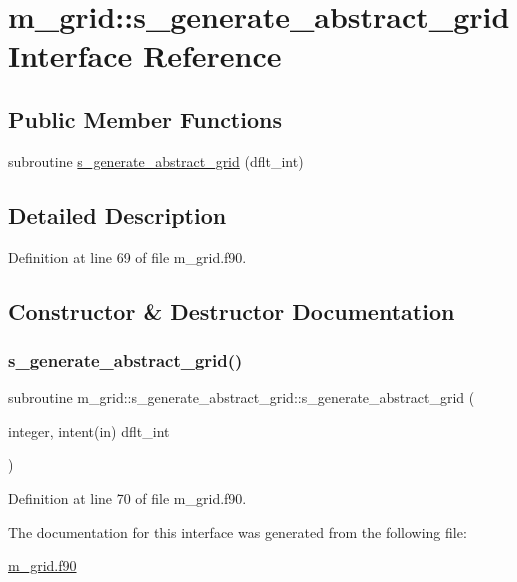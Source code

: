 \hypertarget{interfacem__grid_1_1s__generate__abstract__grid}{}\section{m\+\_\+grid\+:\+:s\+\_\+generate\+\_\+abstract\+\_\+grid Interface Reference}
\label{interfacem__grid_1_1s__generate__abstract__grid}
\subsection*{Public Member Functions}
\begin{DoxyCompactItemize}
\item 
subroutine \hyperlink{interfacem__grid_1_1s__generate__abstract__grid_a44c520d32129f63db3350daf069cba5e}{s\+\_\+generate\+\_\+abstract\+\_\+grid} (dflt\+\_\+int)
\end{DoxyCompactItemize}


\subsection{Detailed Description}


Definition at line 69 of file m\+\_\+grid.\+f90.



\subsection{Constructor \& Destructor Documentation}
\mbox{\label{interfacem__grid_1_1s__generate__abstract__grid_a44c520d32129f63db3350daf069cba5e}} 
\subsubsection{\texorpdfstring{s\+\_\+generate\+\_\+abstract\+\_\+grid()}{s\_generate\_abstract\_grid()}}
{\footnotesize\ttfamily subroutine m\+\_\+grid\+::s\+\_\+generate\+\_\+abstract\+\_\+grid\+::s\+\_\+generate\+\_\+abstract\+\_\+grid (\begin{DoxyParamCaption}\item[{integer, intent(in)}]{dflt\+\_\+int }\end{DoxyParamCaption})}



Definition at line 70 of file m\+\_\+grid.\+f90.



The documentation for this interface was generated from the following file\+:\begin{DoxyCompactItemize}
\item 
\hyperlink{m__grid_8f90}{m\+\_\+grid.\+f90}\end{DoxyCompactItemize}
